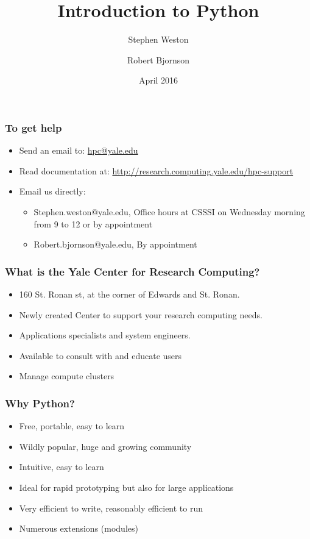 \documentclass[10pt]{beamer}
\title{Introduction to Python}
\author{{Stephen Weston} \and {Robert Bjornson}}
\institute[Yale]{
  Yale Center for Research Computing \\
  Yale University
}
\date{April 2016}
\begin{document}
\begin{frame}[plain]
  \titlepage
\end{frame}

\begin{frame}
\frametitle{To get help}
\begin{itemize}
\item Send an email to: \url{hpc@yale.edu}
\item Read documentation at: \url{http://research.computing.yale.edu/hpc-support}
\item Email us directly:
\begin{itemize}
\item Stephen.weston@yale.edu, Office hours at CSSSI on Wednesday morning from 9 to 12 or by appointment
\item Robert.bjornson@yale.edu, By appointment
\end{itemize}
\end{itemize}
\end{frame}

\begin{frame}
\frametitle{What is the Yale Center for Research Computing?}

\begin{itemize}
\item 160 St. Ronan st, at the corner of Edwards and St. Ronan.
\item Newly created Center to support your research computing needs.
\item Applications specialists and system engineers.
\item Available to consult with and educate users
\item Manage compute clusters
\end{itemize}
\end{frame}

\begin{frame}
\frametitle{Why Python?}

\begin{itemize}
\item Free, portable, easy to learn
\item Wildly popular, huge and growing community
\item Intuitive, easy to learn
\item Ideal for rapid prototyping but also for large applications
\item Very efficient to write, reasonably efficient to run
\item Numerous extensions (modules)
\end{itemize}
\end{frame}
\end{document}
